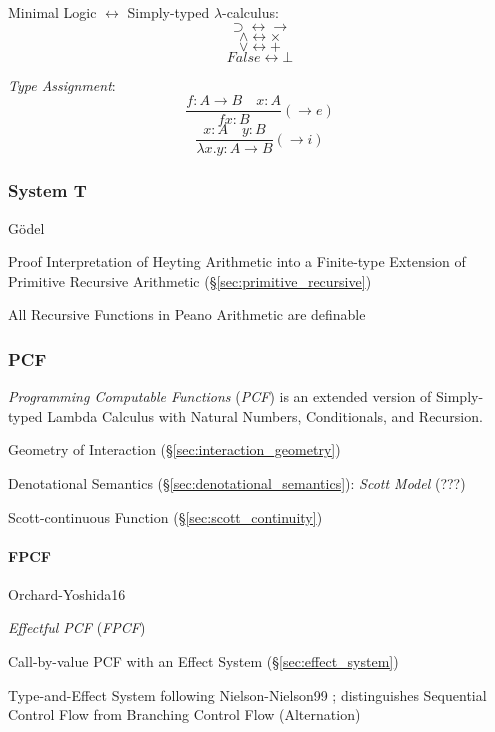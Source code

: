 Minimal Logic $\leftrightarrow$ Simply-typed $\lambda$-calculus:
\[
  \supset \leftrightarrow \rightarrow
\] \[
  \wedge \leftrightarrow \times
\] \[
  \vee \leftrightarrow +
\] \[
  False \leftrightarrow \bot
\]



\emph{Type Assignment}:
\[
  \frac{
    f:A \rightarrow B \quad x:A
  }{
    f x : B
  }(\rightarrow e)
\]\[
  \frac{
    x:A \quad y:B
  }{
    \lambda x.y : A \rightarrow B
  }(\rightarrow i)
\]



\subsubsection{System T}\label{sec:system_t}

G\"odel

Proof Interpretation of Heyting Arithmetic into a Finite-type
Extension of Primitive Recursive Arithmetic
(\S\ref{sec:primitive_recursive})

All Recursive Functions in Peano Arithmetic are definable



\subsubsection{PCF}\label{sec:pcf}

\emph{Programming Computable Functions} (\emph{PCF}) is an extended
version of Simply-typed Lambda Calculus with Natural Numbers,
Conditionals, and Recursion.

Geometry of Interaction (\S\ref{sec:interaction_geometry})

Denotational Semantics (\S\ref{sec:denotational_semantics}):
\emph{Scott Model} (???)

Scott-continuous Function (\S\ref{sec:scott_continuity})



\paragraph{FPCF}\label{sec:fpcf}\hfill

Orchard-Yoshida16 \cite{orchard-yoshida16}

\emph{Effectful PCF} (\emph{FPCF})

Call-by-value PCF with an Effect System (\S\ref{sec:effect_system})

\fist Type-and-Effect System following Nielson-Nielson99
\cite{nielson-nielson99}; distinguishes Sequential Control Flow from
Branching Control Flow (Alternation)

